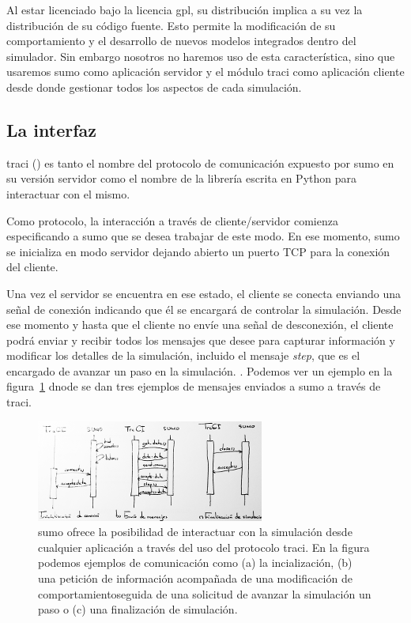 {Al estar licenciado bajo la licencia \gls{gpl}, su distribución implica a su vez la distribución de su código fuente. Esto permite la modificación de su comportamiento y el desarrollo de nuevos modelos integrados dentro del simulador. Sin embargo nosotros no haremos uso de esta característica, sino que usaremos \gls{sumo} como aplicación servidor y el módulo \gls{traci} como aplicación cliente desde donde gestionar todos los aspectos de cada simulación.

\subsection{La interfaz }

\gls{traci} (\cite{Wegener2008}) es tanto el nombre del protocolo de comunicación expuesto por \gls{sumo} en su versión servidor como el nombre de la librería escrita en Python para interactuar con el mismo.

Como protocolo, la interacción a través de cliente/servidor comienza especificando a \gls{sumo} que se desea trabajar de este modo. En ese momento, \gls{sumo} se inicializa en modo servidor dejando abierto un puerto TCP para la conexión del cliente.

Una vez el servidor se encuentra en ese estado, el cliente se conecta enviando una señal de conexión indicando que él se encargará de controlar la simulación. Desde ese momento y hasta que el cliente no envíe una señal de desconexión, el cliente podrá enviar y recibir todos los mensajes que desee para capturar información y modificar los detalles de la simulación, incluido el mensaje \textit{step}, que es el encargado de avanzar un paso en la simulación. . Podemos ver un ejemplo en la figura~\ref{fig:traci-messages} dnode se dan tres ejemplos de mensajes enviados a \gls{sumo} a través de \gls{traci}.

\begin{figure}
	\centering
	\includegraphics{images/traci-messages}
	\caption{\gls{sumo} ofrece la posibilidad de interactuar con la simulación desde cualquier aplicación a través del uso del protocolo \gls{traci}. En la figura podemos ejemplos de comunicación como (a) la incialización, (b) una petición de información acompañada de una modificación de comportamientoseguida de una solicitud de avanzar la simulación un paso o (c) una finalización de simulación.}
	\label{fig:traci-messages}
\end{figure}

}
